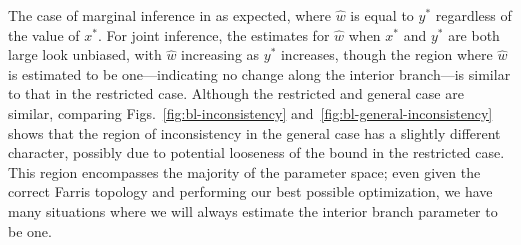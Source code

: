 \documentclass{article}
\begin{document}
The case of marginal inference in as expected, where $\hat{w}$ is equal to $y^*$ regardless of the value of $x^*$.
For joint inference, the estimates for $\hat{w}$ when $x^*$ and $y^*$ are both large look unbiased, with $\hat{w}$ increasing as $y^*$ increases, though the region where $\hat{w}$ is estimated to be one---indicating no change along the interior branch---is similar to that in the restricted case.
Although the restricted and general case are similar, comparing Figs.~\ref{fig:bl-inconsistency} and~\ref{fig:bl-general-inconsistency} shows that the region of inconsistency in the general case has a slightly different character, possibly due to potential looseness of the bound in the restricted case.
This region encompasses the majority of the parameter space; even given the correct Farris topology and performing our best possible optimization, we have many situations where we will always estimate the interior branch parameter to be one.
\end{document}
